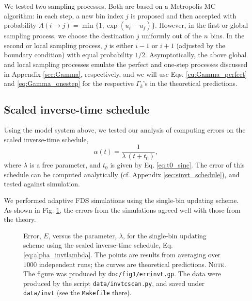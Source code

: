 \documentclass[reprint, floatfix]{revtex4-1}
\newcommand{\note}[1]{{\color{DarkGreen}\footnotesize \textsc{Note.} #1}}
\newcommand{\Err}{E}
\begin{document}
We tested two sampling processes.
%
Both are based on
a Metropolis MC algorithm\cite{
  metropolis1953, newman, frenkel,
  landau_binder}:
%
in each step, a new bin index $j$ is proposed
and then accepted with probability
%
$
A(i \to j) = \min\{ 1, \exp(u_i - u_j) \}.
$
However,
in the first or global sampling process,
we choose the destination $j$
uniformly out of the $n$ bins.
%
In the second or local sampling process,
$j$ is either $i - 1$ or $i + 1$
(adjusted by the boundary condition)
with equal probability $1/2$.
%
Asymptotically,
the above global and local sampling processes
emulate the perfect and one-step processes
discussed in Appendix \ref{sec:Gamma},
respectively,
and we will use
Eqs. \eqref{eq:Gamma_perfect}
and \eqref{eq:Gamma_onestep}
for the respective $\Gamma_k$'s
in the theoretical predictions.
%



\subsection{\label{sec:results_invt}
Scaled inverse-time schedule}


Using the model system above, we
tested our analysis of computing errors
on the scaled inverse-time schedule,
%
\begin{equation}
\alpha(t) = \frac{1}{\lambda \, (t + t_0) },
\label{eq:alpha_invtlambda}
\end{equation}
%
where $\lambda$ is a free parameter,
and $t_0$ is given by Eq. \eqref{eq:t0_sinc}.
%
The error of this schedule
can be computed analytically
(cf. Appendix \ref{sec:sinvt_schedule}),
and tested against simulation.



We performed adaptive FDS simulations
using the single-bin updating scheme.
%
%
As shown in Fig. \ref{fig:errinvt},
the errors from the simulations
agreed well with those from the theory.


\begin{figure}[h]
\begin{center}
  \caption{
    \label{fig:errinvt}
    Error, $\Err$, versus the parameter, $\lambda$,
    for the single-bin updating scheme
    using the scaled inverse-time schedule,
    Eq. \eqref{eq:alpha_invtlambda}.
    The points are results from averaging over $1000$ independent runs;
    the curves are theoretical predictions.
    \note{The figure was produced by \texttt{doc/fig1/errinvt.gp}.
      The data were produced by the script \texttt{data/invtcscan.py},
      and saved under \texttt{data/invt}
      (see the \texttt{Makefile} there).
    }%
  }
\end{center}
\end{figure}
\end{document}
